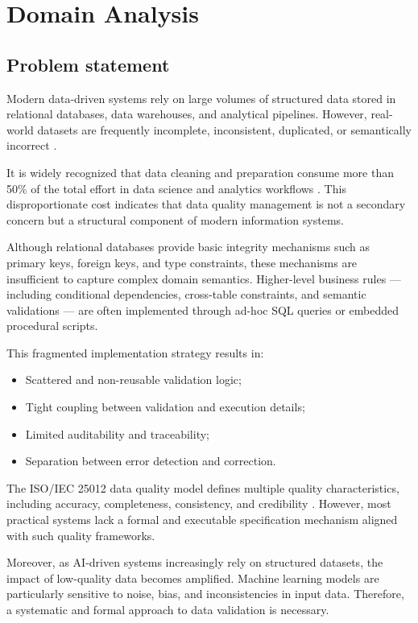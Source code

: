 \chapter{Domain Analysis}


\section{Problem statement}

Modern data-driven systems rely on large volumes of structured data stored in
relational databases, data warehouses, and analytical pipelines. However,
real-world datasets are frequently incomplete, inconsistent, duplicated, or
semantically incorrect \cite{rahm2000data,chu2016datacleaning}.

It is widely recognized that data cleaning and preparation consume more than
50\% of the total effort in data science and analytics workflows
\cite{rahm2000data,chu2016datacleaning}. This disproportionate cost indicates
that data quality management is not a secondary concern but a structural
component of modern information systems.

Although relational databases provide basic integrity mechanisms such as primary
keys, foreign keys, and type constraints, these mechanisms are insufficient to
capture complex domain semantics. Higher-level business rules --- including
conditional dependencies, cross-table constraints, and semantic validations ---
are often implemented through ad-hoc SQL queries or embedded procedural scripts.

This fragmented implementation strategy results in:
\begin{itemize}[label=-, noitemsep]
    \item Scattered and non-reusable validation logic;
    \item Tight coupling between validation and execution details;
    \item Limited auditability and traceability;
    \item Separation between error detection and correction.
\end{itemize}

The ISO/IEC 25012 data quality model defines multiple quality characteristics,
including accuracy, completeness, consistency, and credibility \cite{iso25012}.
However, most practical systems lack a formal and executable specification
mechanism aligned with such quality frameworks.

Moreover, as AI-driven systems increasingly rely on structured datasets, the
impact of low-quality data becomes amplified. Machine learning models are
particularly sensitive to noise, bias, and inconsistencies in input data.
Therefore, a systematic and formal approach to data validation is necessary.

